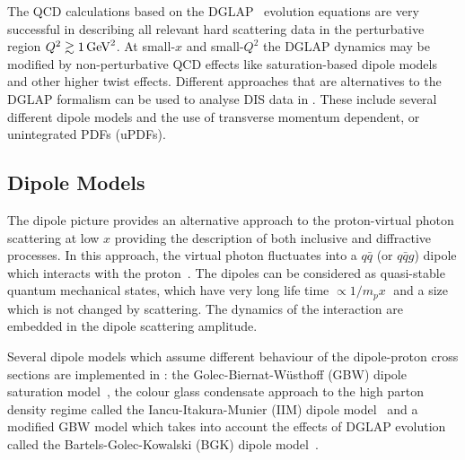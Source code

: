

The QCD calculations based on the DGLAP~\cite{Gribov:1972ri,Gribov:1972rt,Lipatov:1974qm,
Dokshitzer:1977sg,Altarelli:1977zs} evolution equations are very successful in describing
all relevant hard scattering data in the perturbative region $Q^2 \gtrsim 1 \,\text{Ge\hspace{-.08em}V}^2$.
At small-$x$ and small-$Q^2$ the DGLAP dynamics may be modified by non-perturbative QCD 
effects like saturation-based dipole models and other higher twist effects.
%
Different approaches that are alternatives to the DGLAP formalism can be used to analyse DIS data in \fitter.
These include several different dipole models and the use of 
transverse momentum dependent, or unintegrated PDFs (uPDFs).

\subsection{Dipole Models}

The dipole picture provides an alternative approach to the proton-virtual photon
 scattering at low $x$ providing the description of both inclusive and 
diffractive processes.
 In this approach, the virtual photon fluctuates into a $q\bar q$ (or $q\bar q g$) 
 dipole which interacts with the proton~\cite{NNZ:91}.  
The dipoles can be considered as quasi-stable quantum mechanical states, which have very long 
life time $\propto 1/m_p x\;$ and a size which is not changed by scattering.
The dynamics of the interaction are embedded in the dipole scattering amplitude.


Several dipole models which assume different behaviour of the dipole-proton 
cross sections are implemented in \fitter:
the Golec-Biernat-W\"usthoff (GBW)
dipole saturation model~\cite{Golec-Biernat:1998js},
the colour glass condensate approach to the high parton density 
regime called the Iancu-Itakura-Munier (IIM) dipole model~\cite{Iancu:2003ge} and 
a modified GBW model which takes into account the effects of  
DGLAP evolution called the Bartels-Golec-Kowalski (BGK) dipole model~\cite{Bartels:2002cj}.

